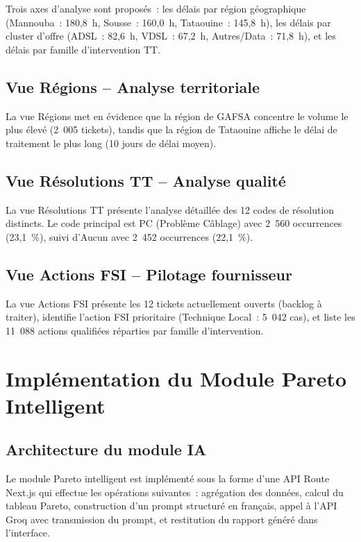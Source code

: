 \documentclass[11pt,a4paper]{report}
\begin{document}
Trois axes d'analyse sont proposés~: les délais par région géographique (Mannouba~: 180,8~h, Sousse~: 160,0~h, Tataouine~: 145,8~h), les délais par cluster d'offre (ADSL~: 82,6~h, VDSL~: 67,2~h, Autres/Data~: 71,8~h), et les délais par famille d'intervention TT.

\subsection{Vue Régions -- Analyse territoriale}

La vue Régions met en évidence que la région de GAFSA concentre le volume le plus élevé (2~005 tickets), tandis que la région de Tataouine affiche le délai de traitement le plus long (10 jours de délai moyen).

\subsection{Vue Résolutions TT -- Analyse qualité}

La vue Résolutions TT présente l'analyse détaillée des 12 codes de résolution distincts. Le code principal est PC (Problème Câblage) avec 2~560 occurrences (23,1~\%), suivi d'Aucun avec 2~452 occurrences (22,1~\%).

\subsection{Vue Actions FSI -- Pilotage fournisseur}

La vue Actions FSI présente les 12 tickets actuellement ouverts (backlog à traiter), identifie l'action FSI prioritaire (Technique Local~: 5~042 cas), et liste les 11~088 actions qualifiées réparties par famille d'intervention.

\section{Implémentation du Module Pareto Intelligent}

\subsection{Architecture du module IA}

Le module Pareto intelligent est implémenté sous la forme d'une API Route Next.js qui effectue les opérations suivantes~: agrégation des données, calcul du tableau Pareto, construction d'un prompt structuré en français, appel à l'API Groq avec transmission du prompt, et restitution du rapport généré dans l'interface.
\end{document}

